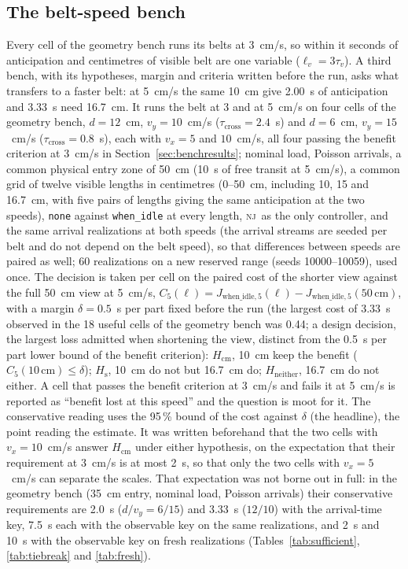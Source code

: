 \documentclass[11pt,a4paper]{article}
\newcommand{\nj}{\textsc{nj}}
\newcommand{\tcross}{\tau_{\mathrm{cross}}}
\newcommand{\tv}{\tau_{v}}
\newcommand{\lv}{\ell_{v}}
\begin{document}
\subsection{The belt-speed bench}\label{sec:beltdesign}
Every cell of the geometry bench runs its belts at 3~cm/s, so within it seconds of
anticipation and centimetres of visible belt are one variable ($\lv=3\tv$). A third
bench, with its hypotheses, margin and criteria written before the run, asks what
transfers to a faster belt: at 5~cm/s the same 10~cm give 2.00~s of anticipation and
3.33~s need 16.7~cm. It runs the belt at 3 and at 5~cm/s on four cells of the geometry
bench, $d=12$~cm, $v_y=10$~cm/s ($\tcross=2.4$~s) and $d=6$~cm, $v_y=15$~cm/s
($\tcross=0.8$~s), each with $v_x=5$ and $10$~cm/s, all four passing the benefit
criterion at 3~cm/s in Section~\ref{sec:benchresults}; nominal load, Poisson arrivals,
a common physical entry zone of 50~cm (10~s of free transit at 5~cm/s), a common grid of
twelve visible lengths in centimetres (0--50~cm, including 10, 15 and 16.7~cm, with
five pairs of lengths giving the same anticipation at the two speeds), \texttt{none}
against \texttt{when\_idle} at every length, \nj\ as the only controller, and the same
arrival realizations at both speeds (the arrival streams are seeded per belt and do not
depend on the belt speed), so that differences between speeds are paired as well; 60
realizations on a new reserved range (seeds 10000--10059), used once. The decision is taken per cell on the
paired cost of the shorter view against the full 50~cm view at 5~cm/s,
$C_5(\ell)=J_{\mathrm{when\_idle},5}(\ell)-J_{\mathrm{when\_idle},5}(50\,\mathrm{cm})$,
with a margin $\delta=0.5$~s per part fixed before the run (the largest cost of 3.33~s
observed in the 18 useful cells of the geometry bench was 0.44; a design decision, the
largest loss admitted when shortening the view, distinct from the 0.5~s per part lower
bound of the benefit criterion): $H_{\mathrm{cm}}$, 10~cm
keep the benefit ($C_5(10\,\mathrm{cm})\le\delta$); $H_{\mathrm{s}}$, 10~cm do not but
16.7~cm do; $H_{\mathrm{neither}}$, 16.7~cm do not either. A cell that passes the
benefit criterion at 3~cm/s and fails it at 5~cm/s is reported as ``benefit lost at this
speed'' and the question is moot for it. The conservative reading uses the 95\,\% bound
of the cost against $\delta$ (the headline), the point reading the estimate. It was
written beforehand that the two cells with $v_x=10$~cm/s answer $H_{\mathrm{cm}}$
under either hypothesis, on the expectation that their requirement at 3~cm/s is at most
2~s, so that only the two cells with $v_x=5$~cm/s can separate the scales. That expectation
was not borne out in full: in the geometry bench (35~cm entry, nominal load, Poisson
arrivals) their conservative requirements are 2.0~s ($d/v_y=6/15$) and 3.33~s ($12/10$)
with the arrival-time key, 7.5~s each with the observable key on the same realizations,
and 2~s and 10~s with the observable key on fresh realizations (Tables~\ref{tab:sufficient},
\ref{tab:tiebreak} and \ref{tab:fresh}).
\end{document}

